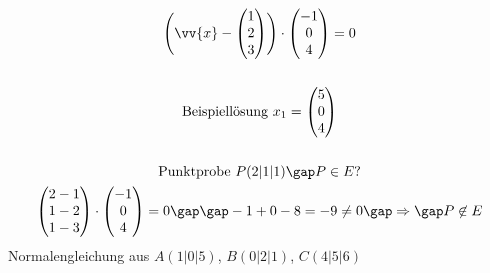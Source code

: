 \begin{gather*}
  \Biggl(\vv{x} - \begin{pmatrix}1 \\ 2 \\ 3\end{pmatrix}\Biggr) \cdot \begin{pmatrix}-1 \\ 0 \\ 4\end{pmatrix} = 0 \\\\
  \text{Beispiellösung } x_1 = \begin{pmatrix}5 \\ 0 \\ 4\end{pmatrix} \\\\
  \text{Punktprobe } P(2|1|1) \gap P \in E ? \\
  \begin{pmatrix}2 - 1 \\ 1 - 2 \\ 1 - 3\end{pmatrix} \cdot \begin{pmatrix}-1 \\ 0 \\ 4\end{pmatrix} = 0 \gap\gap -1 + 0 - 8 = -9 \neq 0 \gap\Rightarrow\gap P \not\in E
\end{gather*}
Normalengleichung aus $A(1|0|5)$, $B(0|2|1)$, $C(4|5|6)$

